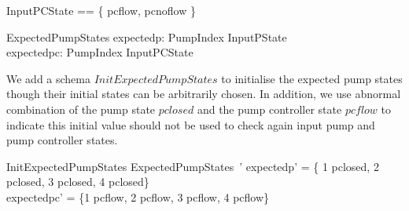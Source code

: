 \documentclass{report} %
\begin{document}
\begin{zed}
  InputPCState == \{ pcflow, pcnoflow \}
\end{zed}

\begin{schema}{ExpectedPumpStates}
  expectedp: PumpIndex \fun InputPState
  \\ %
  expectedpc: PumpIndex \fun InputPCState
\end{schema}

We add a schema $InitExpectedPumpStates$ to initialise the expected pump states though their initial states can be arbitrarily chosen. In addition, we use abnormal combination of the pump state $pclosed$ and the pump controller state $pcflow$ to indicate this initial value should not be used to check again input pump and pump controller states.    
\begin{schema}{InitExpectedPumpStates}
    ExpectedPumpStates~' 
    \where
    expectedp' = \{ 1 \mapsto pclosed, 2 \mapsto pclosed, 3 \mapsto pclosed, 4 \mapsto pclosed\}\\ 
    expectedpc' = \{1 \mapsto pcflow, 2 \mapsto pcflow, 3 \mapsto pcflow, 4 \mapsto pcflow\}\\ 
\end{schema}
\end{document}
